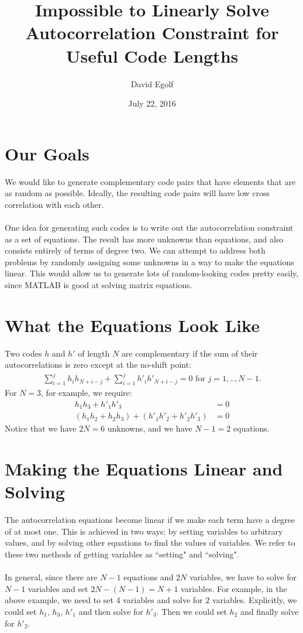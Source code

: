 \documentclass[a4paper]{article}
\title{\LARGE Impossible to Linearly Solve Autocorrelation Constraint for Useful Code Lengths}
\author{David Egolf}
\date{July 22, 2016}
\begin{document}
\maketitle

\section*{Our Goals}
We would like to generate complementary code pairs that have elements that are as random as possible. Ideally, the resulting code pairs will have low cross correlation with each other.
\\\\
One idea for generating such codes is to write out the autocorrelation constraint as a set of equations. The result has more unknowns than equations, and also consists entirely of terms of degree two. We can attempt to address both problems by randomly assigning some unknowns in a way to make the equations linear. This would allow us to generate lots of random-looking codes pretty easily, since MATLAB is good at solving matrix equations.

\section*{What the Equations Look Like}
Two codes $h$ and $h'$ of length $N$ are complementary if the sum of their autocorrelations is zero except at the no-shift point:
\begin{align*}
\sum_{i=1}^j{h_i h_{N+i-j}} + \sum_{i=1}^j{h'_i h'_{N+i-j}} = 0 \text{ for $j=1,..,N-1$.}
\end{align*}
For $N=3$, for example, we require:
\begin{align*}
h_1h_3 + h'_1h'_3 &= 0 \\
(h_1h_2 + h_2h_3) + (h'_1h'_2 + h'_2h'_3)&= 0
\end{align*}
Notice that we have $2N = 6$ unknowns, and we have $N-1 = 2$ equations.
\section*{Making the Equations Linear and Solving}
The autocorrelation equations become linear if we make each term have a degree of at most one. This is achieved in two ways: by setting variables to arbitrary values, and by solving other equations to find the values of variables. We refer to these two methods of getting variables as ``setting" and ``solving".
\\\\
In general, since there are $N-1$ equations and $2N$ variables, we have to solve for $N-1$ variables and set $2N - (N-1) = N + 1$ variables. For example, in the above example, we need to set $4$ variables and solve for $2$ variables. Explicitly, we could set $h_1$, $h_3$, $h'_1$ and then solve for $h'_3$. Then we could set $h_2$ and finally solve for $h'_2$.
\clearpage
\end{document}
